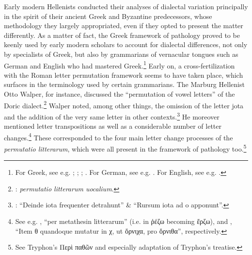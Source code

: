 Early modern Hellenists conducted their analyses of dialectal variation principally in the spirit of their ancient Greek and Byzantine predecessors, whose methodology they largely appropriated, even if they opted to present the matter differently. As a matter of fact, the Greek framework of pathology proved to be keenly used by early modern scholars to account for dialectal differences, not only by specialists of Greek, but also by grammarians of vernacular tongues such as German and English who had mastered Greek.\footnote{{For Greek, see e.g. \citet[b.iv\textsc{\textsuperscript{v}}]{Melanchthon1518}; \citet[{7}{\textsc{\textsuperscript{v}}}{–11}{\textsc{\textsuperscript{v}}}]{Baile1588}; \citet[11]{Schmidt1604}; \citet[2–8, 20–22]{Hill1658}. For German, see e.g. \citet{Wolf1578}. For English, see e.g. \citet[130-133]{Gill1619}.}} Early on, a cross-fertilization with the Roman letter permutation framework seems to have taken place, which surfaces in the terminology used by certain grammarians. The Marburg Hellenist Otto Walper, for instance, discussed the “permutation of vowel letters” of the Doric dialect.\footnote{{\citet[62]{Walper1589}:} {\textit{permutatio litterarum uocalium}}.} Walper noted, among other things, the omission of the letter jota and the addition of the very same letter in other contexts.\footnote{{\citet[63]{Walper1589}: “Deinde iota frequenter detrahunt” \& “Rursum iota ad o apponunt”.}} He moreover mentioned letter transpositions as well as a considerable number of letter changes.\footnote{{See e.g. \citet[63]{Walper1589}, “per metathesin litterarum” (i.e. in ῥέζω becoming ἔρζω), and \citet[64]{Walper1589}, “Item θ quandoque mutatur in χ, ut ὄρνιχα, pro ὄρνιθα”, respectively.}} These corresponded to the four main letter change processes of the \textit{permutatio litterarum}, which were all present in the framework of pathology too.\footnote{{See Tryphon’s Περὶ παθῶν and especially \citet[\textsc{p.}{iv}{\textsc{\textsuperscript{v}}}]{Amerot1520} adaptation of Tryphon’s  treatise.}}

